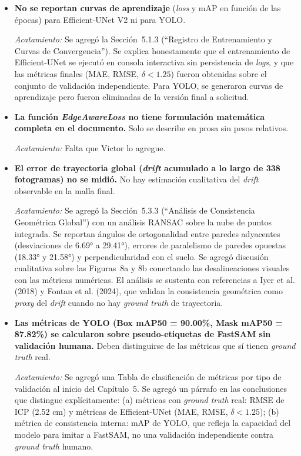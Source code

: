 \documentclass[12pt, a4paper]{article}
\begin{document}
\begin{itemize}[leftmargin=*, itemsep=1em]
\item \textbf{No se reportan curvas de aprendizaje} (\textit{loss} y mAP en función de las épocas) para Efficient-UNet V2 ni para YOLO.

\textit{Acatamiento:} Se agregó la Sección~5.1.3 (``Registro de Entrenamiento y Curvas de Convergencia''). Se explica honestamente que el entrenamiento de Efficient-UNet se ejecutó en consola interactiva sin persistencia de \textit{logs}, y que las métricas finales (MAE, RMSE, $\delta < 1.25$) fueron obtenidas sobre el conjunto de validación independiente. Para YOLO, se generaron curvas de aprendizaje pero fueron eliminadas de la versión final a solicitud.

\item \textbf{La función \textit{EdgeAwareLoss} no tiene formulación matemática completa en el documento.} Solo se describe en prosa sin pesos relativos.

\textit{Acatamiento:} Falta que Victor lo agregue.

\item \textbf{El error de trayectoria global (\textit{drift} acumulado a lo largo de 338 fotogramas) no se midió.} No hay estimación cualitativa del \textit{drift} observable en la malla final.

\textit{Acatamiento:} Se agregó la Sección~5.3.3 (``Análisis de Consistencia Geométrica Global'') con un análisis RANSAC sobre la nube de puntos integrada. Se reportan ángulos de ortogonalidad entre paredes adyacentes (desviaciones de 6.69° a 29.41°), errores de paralelismo de paredes opuestas (18.33° y 21.58°) y perpendicularidad con el suelo. Se agregó discusión cualitativa sobre las Figuras~8a y 8b conectando las desalineaciones visuales con las métricas numéricas. El análisis se sustenta con referencias a Iyer et al. (2018) y Fontan et al. (2024), que validan la consistencia geométrica como \textit{proxy} del \textit{drift} cuando no hay \textit{ground truth} de trayectoria.

\item \textbf{Las métricas de YOLO (Box mAP50 = 90.00\%, Mask mAP50 = 87.82\%) se calcularon sobre pseudo-etiquetas de FastSAM sin validación humana.} Deben distinguirse de las métricas que sí tienen \textit{ground truth} real.

\textit{Acatamiento:} Se agregó una Tabla de clasificación de métricas por tipo de validación al inicio del Capítulo~5. Se agregó un párrafo en las conclusiones que distingue explícitamente: (a) métricas con \textit{ground truth} real: RMSE de ICP (2.52 cm) y métricas de Efficient-UNet (MAE, RMSE, $\delta < 1.25$); (b) métrica de consistencia interna: mAP de YOLO, que refleja la capacidad del modelo para imitar a FastSAM, no una validación independiente contra \textit{ground truth} humano.


\end{itemize}
\end{document}
